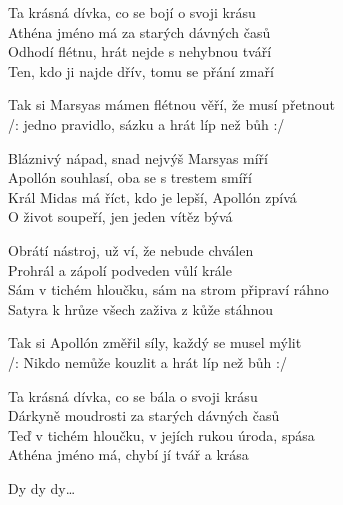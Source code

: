 
\ve{}
Ta krásná dívka, co se bojí o svoji krásu\\
Athéna jméno má za starých dávných časů\\
Odhodí flétnu, hrát nejde s nehybnou tváří\\
Ten, kdo ji najde dřív, tomu se přání zmaří

\cho{}
Tak si Marsyas mámen flétnou věří, že musí přetnout\\
/: jedno pravidlo, sázku a hrát líp než bůh :/

\ve{}
Bláznivý nápad, snad nejvýš Marsyas míří\\
Apollón souhlasí, oba se s trestem smíří\\
Král Midas má říct, kdo je lepší, Apollón zpívá\\
O život soupeří, jen jeden vítěz bývá

\cho{}

\ve{}
Obrátí nástroj, už ví, že nebude chválen\\
Prohrál a zápolí podveden vůlí krále\\
Sám v tichém hloučku, sám na strom připraví ráhno\\
Satyra k hrůze všech zaživa z kůže stáhnou

\cho{}
Tak si Apollón změřil síly, každý se musel mýlit\\
/: Nikdo nemůže kouzlit a hrát líp než bůh :/

\ve{}
Ta krásná dívka, co se bála o svoji krásu\\
Dárkyně moudrosti za starých dávných časů\\
Teď v tichém hloučku, v jejích rukou úroda, spása\\
Athéna jméno má, chybí jí tvář a krása

\cho{}
Dy dy dy\ldots{}

\esong{}